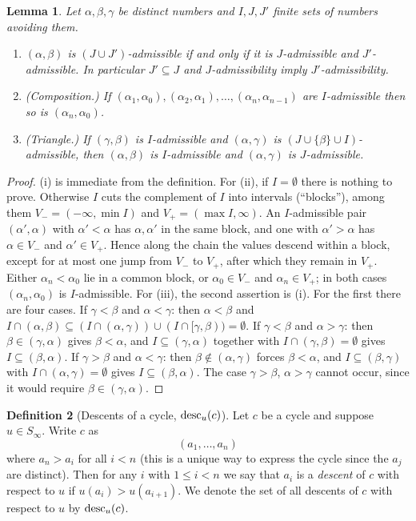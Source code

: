 \documentclass{amsart}
\newtheorem{lemma}{Lemma}[section]
\theoremstyle{definition}
\newtheorem{definition}[lemma]{Definition}
\theoremstyle{remark}
\numberwithin{equation}{section}
\begin{document}
\begin{lemma} \label{lemma:admissible}
Let $\alpha,\beta,\gamma$ be distinct numbers and $I,J,J'$ finite sets of numbers avoiding them.
\begin{enumerate}
\item[(i)] $(\alpha,\beta)$ is $(J\cup J')$-admissible if and only if it is $J$-admissible and $J'$-admissible. In particular $J'\subseteq J$ and $J$-admissibility imply $J'$-admissibility.
\item[(ii)] (Composition.) If $(\alpha_1,\alpha_0),(\alpha_2,\alpha_1),\ldots,(\alpha_n,\alpha_{n-1})$ are $I$-admissible then so is $(\alpha_n,\alpha_0)$.
\item[(iii)] (Triangle.) If $(\gamma,\beta)$ is $I$-admissible and $(\alpha,\gamma)$ is $(J\cup\{\beta\}\cup I)$-admissible, then $(\alpha,\beta)$ is $I$-admissible and $(\alpha,\gamma)$ is $J$-admissible.
\end{enumerate}
\end{lemma}
\begin{proof}
(i) is immediate from the definition. For (ii), if $I=\emptyset$ there is nothing to prove. Otherwise $I$ cuts the complement of $I$ into intervals (``blocks''), among them $V_-=(-\infty,\min I)$ and $V_+=(\max I,\infty)$. An $I$-admissible pair $(\alpha',\alpha)$ with $\alpha'<\alpha$ has $\alpha,\alpha'$ in the same block, and one with $\alpha'>\alpha$ has $\alpha\in V_-$ and $\alpha'\in V_+$. Hence along the chain the values descend within a block, except for at most one jump from $V_-$ to $V_+$, after which they remain in $V_+$. Either $\alpha_n<\alpha_0$ lie in a common block, or $\alpha_0\in V_-$ and $\alpha_n\in V_+$; in both cases $(\alpha_n,\alpha_0)$ is $I$-admissible. For (iii), the second assertion is (i). For the first there are four cases. If $\gamma<\beta$ and $\alpha<\gamma$: then $\alpha<\beta$ and $I\cap(\alpha,\beta)\subseteq (I\cap(\alpha,\gamma))\cup(I\cap[\gamma,\beta))=\emptyset$. If $\gamma<\beta$ and $\alpha>\gamma$: then $\beta\in(\gamma,\alpha)$ gives $\beta<\alpha$, and $I\subseteq(\gamma,\alpha)$ together with $I\cap(\gamma,\beta)=\emptyset$ gives $I\subseteq(\beta,\alpha)$. If $\gamma>\beta$ and $\alpha<\gamma$: then $\beta\notin(\alpha,\gamma)$ forces $\beta<\alpha$, and $I\subseteq(\beta,\gamma)$ with $I\cap(\alpha,\gamma)=\emptyset$ gives $I\subseteq(\beta,\alpha)$. The case $\gamma>\beta$, $\alpha>\gamma$ cannot occur, since it would require $\beta\in(\gamma,\alpha)$.
\end{proof}

\begin{definition}[Descents of a cycle, $\mathrm{desc}_u(c)$]
Let $c$ be a cycle and suppose $u\in S_\infty$. Write $c$ as
$$(a_1,\ldots,a_n)$$
where $a_n>a_i$ for all $i<n$ (this is a unique way to express the cycle since the $a_j$ are distinct). Then for any $i$ with $1\leq i<n$ we say that $a_i$ is a \emph{descent} of $c$ with respect to $u$ if $u(a_i)>u(a_{i+1})$. We denote the set of all descents of $c$ with respect to $u$ by $\mathrm{desc}_u(c)$.
\end{definition}
\end{document}
